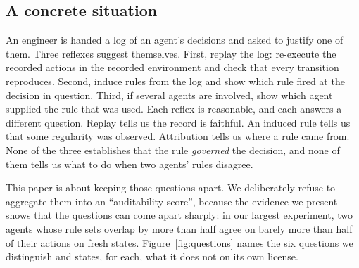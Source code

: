 \documentclass[11pt,a4paper]{article}
\begin{document}
\subsection{A concrete situation}

An engineer is handed a log of an agent's decisions and asked to justify one of them. Three reflexes suggest themselves. First, replay the log: re-execute the recorded actions in the recorded environment and check that every transition reproduces. Second, induce rules from the log and show which rule fired at the decision in question. Third, if several agents are involved, show which agent supplied the rule that was used. Each reflex is reasonable, and each answers a different question. Replay tells us the record is faithful. An induced rule tells us that some regularity was observed. Attribution tells us where a rule came from. None of the three establishes that the rule \emph{governed} the decision, and none of them tells us what to do when two agents' rules disagree.

This paper is about keeping those questions apart. We deliberately refuse to aggregate them into an ``auditability score'', because the evidence we present shows that the questions can come apart sharply: in our largest experiment, two agents whose rule sets overlap by more than half agree on barely more than half of their actions on fresh states. Figure~\ref{fig:questions} names the six questions we distinguish and states, for each, what it does not on its own license.
\end{document}
